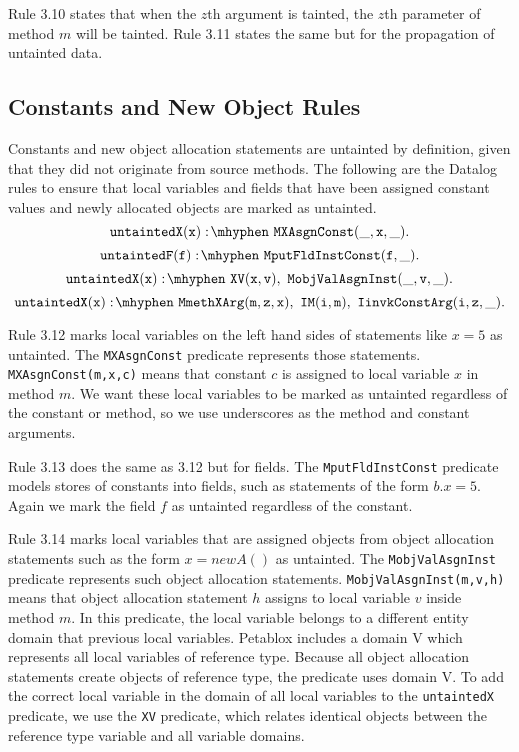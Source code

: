 Rule 3.10 states that when the $z$th argument is tainted, the $z$th
parameter of method $m$ will be tainted. Rule 3.11 states the same but
for the propagation of untainted data.
\subsection{Constants and New Object Rules}
Constants and new object allocation statements are untainted by
definition, given that they did not originate from source methods. The
following are the Datalog rules to ensure that local variables and
fields that have been assigned constant values and newly allocated
objects are marked as untainted.
\begin{equation}
  \mathtt{untaintedX(x) \is MXAsgnConst(\_,x,\_).}
\end{equation}
\begin{equation}
  \mathtt{untaintedF(f) \is MputFldInstConst(f,\_).}
\end{equation}
\begin{equation}
  \mathtt{untaintedX(x) \is XV(x,v) \also MobjValAsgnInst(\_,v,\_).}
\end{equation}
\begin{equation}
  \mathtt{untaintedX(x) \is MmethXArg(m,z,x) \also IM(i,m) \also
    IinvkConstArg(i,z,\_).}
\end{equation}

Rule 3.12 marks local variables on the left hand sides of statements
like $x = 5$ as untainted. The \texttt{MXAsgnConst} predicate
represents those statements. \texttt{MXAsgnConst(m,x,c)} means that
constant $c$ is assigned to local variable $x$ in method $m$. We want
these local variables to be marked as untainted regardless of the
constant or method, so we use underscores as the method and constant
arguments.

Rule 3.13 does the same as 3.12 but for fields. The
\texttt{MputFldInstConst} predicate models stores of constants into
fields, such as statements of the form $b.x = 5$. Again we mark the
field $f$ as untainted regardless of the constant.

Rule 3.14 marks local variables that are assigned objects from object
allocation statements such as the form $x = new A()$ as untainted. The
\texttt{MobjValAsgnInst} predicate represents such object allocation
statements. \texttt{MobjValAsgnInst(m,v,h)} means that object
allocation statement $h$ assigns to local variable $v$ inside method
$m$. In this predicate, the local variable belongs to a different
entity domain that previous local variables. Petablox includes a
domain V which represents all local variables of reference
type. Because all object allocation statements create objects of
reference type, the predicate uses domain V. To add the correct local
variable in the domain of all local variables to the
\texttt{untaintedX} predicate, we use the \texttt{XV} predicate, which
relates identical objects between the reference type variable and all
variable domains.

